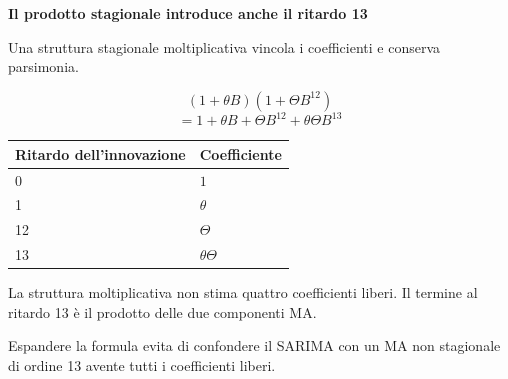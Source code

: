 \documentclass[12pt,aspectratio=1610]{beamer}
\newcommand{\PBody}[1]{\par{\fontsize{11.3}{14.8}\selectfont #1\par}}
\newcommand{\PSmall}[1]{\par{\fontsize{9.8}{13.1}\selectfont #1\par}}
\newcommand{\PInfo}[1]{%
\begin{tcolorbox}[enhanced,arc=1.6mm,boxrule=.55pt,colback=GeoTint,
 colframe=Rule!80!Classical,left=2.3mm,right=2.3mm,top=2mm,bottom=2mm,
 before skip=1mm,after skip=1mm]
\PSmall{#1}\end{tcolorbox}}
\begin{document}
\begin{frame}[plain]\hypertarget{slide47}{}
\begin{lrbox}{\TitleBox}
\begin{minipage}[t]{17.7cm}\raggedright\color{Ink}\fontsize{11.3}{14.8}\selectfont
\color{Navy}\bfseries\fontsize{20.6}{24.5}\selectfont Il prodotto stagionale introduce anche il ritardo 13
\end{minipage}\end{lrbox}

\begin{lrbox}{\RecallBox}
\begin{minipage}[t]{14.3cm}\raggedright\color{Ink}\fontsize{11.3}{14.8}\selectfont
\fontsize{10.3}{13.8}\selectfont Una struttura stagionale moltiplicativa vincola i coefficienti e conserva parsimonia.
\end{minipage}\end{lrbox}

\begin{lrbox}{\PilotLeftBox}
\begin{minipage}[t]{10.05cm}\raggedright\color{Ink}\fontsize{11.3}{14.8}\selectfont
\[(1+\theta B)(1+\Theta B^{12})\]
\[=1+\theta B+\Theta B^{12}+\theta\Theta B^{13}\]
{\fontsize{10.2}{13.1}\selectfont\renewcommand{\arraystretch}{1.45}\begin{tabular}{@{}p{6cm}p{3cm}@{}}\toprule
\textbf{Ritardo dell’innovazione} & \textbf{Coefficiente}\\\midrule
0 & $1$\\
1 & $\theta$\\
12 & $\Theta$\\
13 & $\theta\Theta$\\
\bottomrule\end{tabular}}

\end{minipage}\end{lrbox}

\begin{lrbox}{\PilotRightBox}
\begin{minipage}[t]{7.55cm}\raggedright\color{Ink}\fontsize{11.3}{14.8}\selectfont
\PBody{La struttura moltiplicativa non stima quattro coefficienti liberi. Il termine al ritardo 13 è il prodotto delle due componenti MA.}
\vspace{2.5mm}
\PInfo{Espandere la formula evita di confondere il SARIMA con un MA non stagionale di ordine 13 avente tutti i coefficienti liberi.}


\end{minipage}
\end{lrbox}
\end{frame}
\end{document}
